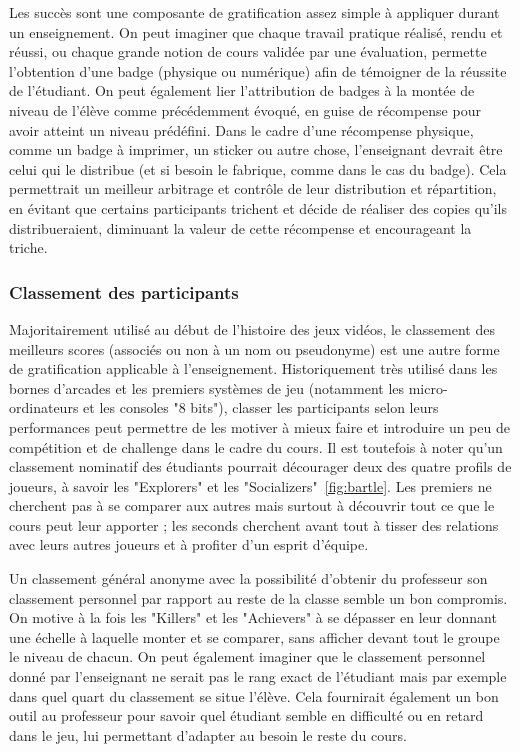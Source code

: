 Les succès sont une composante de gratification assez simple à appliquer durant un enseignement. On peut imaginer que chaque travail pratique réalisé, rendu et réussi, ou chaque grande notion de cours validée par une évaluation, permette l'obtention d'une badge (physique ou numérique) afin de témoigner de la réussite de l'étudiant. On peut également lier l'attribution de badges à la montée de niveau de l'élève comme précédemment évoqué, en guise de récompense pour avoir atteint un niveau prédéfini. Dans le cadre d'une récompense physique, comme un badge à imprimer, un sticker ou autre chose, l'enseignant devrait être celui qui le distribue (et si besoin le fabrique, comme dans le cas du badge). Cela permettrait un meilleur arbitrage et contrôle de leur distribution et répartition, en évitant que certains participants trichent et décide de réaliser des copies qu'ils distribueraient, diminuant la valeur de cette récompense et encourageant la triche.

\subsubsection{Classement des participants}
Majoritairement utilisé au début de l'histoire des jeux vidéos, le classement des meilleurs scores (associés ou non à un nom ou pseudonyme) est une autre forme de gratification applicable à l'enseignement. Historiquement très utilisé dans les bornes d'arcades et les premiers systèmes de jeu (notamment les micro-ordinateurs et les consoles "8 bits"), classer les participants selon leurs performances peut permettre de les motiver à mieux faire et introduire un peu de compétition et de challenge dans le cadre du cours. Il est toutefois à noter qu'un classement nominatif des étudiants pourrait décourager deux des quatre profils de joueurs, à savoir les "Explorers" et les "Socializers"~\ref{fig:bartle}. Les premiers ne cherchent pas à se comparer aux autres mais surtout à découvrir tout ce que le cours peut leur apporter ; les seconds cherchent avant tout à tisser des relations avec leurs autres joueurs et à profiter d'un esprit d'équipe. \par

Un classement général anonyme avec la possibilité d'obtenir du professeur son classement personnel par rapport au reste de la classe semble un bon compromis. On motive à la fois les "Killers" et les "Achievers" à se dépasser en leur donnant une échelle à laquelle monter et se comparer, sans afficher devant tout le groupe le niveau de chacun. On peut également imaginer que le classement personnel donné par l'enseignant ne serait pas le rang exact de l'étudiant mais par exemple dans quel quart du classement se situe l'élève. Cela fournirait également un bon outil au professeur pour savoir quel étudiant semble en difficulté ou en retard dans le jeu, lui permettant d'adapter au besoin le reste du cours.

